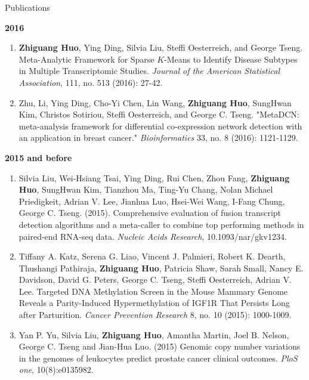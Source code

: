 \documentclass{resume} %
\begin{document}
\begin{rSection}{Publications}
\begin{enumerate}[noitemsep,topsep=0pt, resume]


\end{enumerate}

\textbf{2016}
\begin{enumerate}[noitemsep,topsep=0pt,resume]

 \item  {\bf Zhiguang Huo}, Ying Ding, Silvia Liu, Steffi Oesterreich, and George Tseng. Meta-Analytic Framework for Sparse $K$-Means to Identify Disease Subtypes in Multiple Transcriptomic Studies. \emph{Journal of the American Statistical Association},  111, no. 513 (2016): 27-42.

\item 
Zhu, Li, Ying Ding, Cho-Yi Chen, Lin Wang,  {\bf Zhiguang Huo}, SungHwan Kim, Christos Sotiriou, Steffi Oesterreich, and George C. Tseng. "MetaDCN: meta-analysis framework for differential co-expression network detection with an application in breast cancer." \emph{Bioinformatics} 33, no. 8 (2016): 1121-1129.




\end{enumerate}


\textbf{2015 and before}
\begin{enumerate}[noitemsep,topsep=0pt,resume]
    \item Silvia Liu, Wei-Hsiang Tsai, Ying Ding, Rui Chen, Zhou Fang, {\bf Zhiguang Huo}, SungHwan Kim, Tianzhou Ma, Ting-Yu Chang, Nolan Michael Priedigkeit, Adrian V. Lee, Jianhua Luo, Hsei-Wei Wang, I-Fang Chung, George C. Tseng. (2015).
Comprehensive evaluation of fusion transcript detection algorithms and a meta-caller to combine top performing methods in paired-end RNA-seq data.
\emph{Nucleic Acids Research}, 10.1093/nar/gkv1234.

    \item Tiffany A. Katz, Serena G. Liao, Vincent J. Palmieri, Robert K. Dearth, Thushangi Pathiraja, {\bf Zhiguang Huo}, Patricia Shaw, Sarah Small, Nancy E. Davidson, David G. Peters, George C. Tseng, Steffi Oesterreich, Adrian V. Lee. Targeted DNA Methylation Screen in the Mouse Mammary Genome Reveals a Parity-Induced Hypermethylation of IGF1R That Persists Long after Parturition. \emph{Cancer Prevention Research} 8, no. 10 (2015): 1000-1009.

    \item Yan P. Yu, Silvia Liu, {\bf Zhiguang Huo}, Amantha Martin, Joel B. Nelson, George C. Tseng and Jian-Hua Luo. (2015) Genomic copy number variations in the genomes of leukocytes predict prostate cancer clinical outcomes. \emph{PloS one}, 10(8):e0135982.


\end{enumerate}
\end{rSection}
\end{document}

